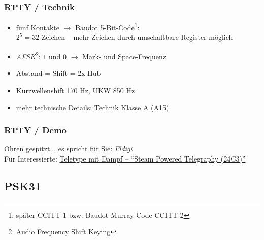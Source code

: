 \begin{frame}
  \frametitle{RTTY / Technik}

  \begin{itemize}
    \item fünf Kontakte $\rightarrow$ Baudot 5-Bit-Code\footnote{später
      CCITT-1 bzw. Baudot-Murray-Code CCITT-2}: \\
      $2^5 = 32$ Zeichen -- mehr
      Zeichen durch umschaltbare Register möglich
    \item \emph{AFSK}\footnote{Audio Frequency Shift Keying}:
      $1$ und $0$ $\rightarrow$ Mark- und Space-Frequenz
    \item Abstand = Shift = 2x Hub
    \item Kurzwellenshift 170 Hz, UKW 850 Hz
    \item mehr technische Details: Technik Klasse A (A15)
  \end{itemize}

\end{frame}

\begin{frame}
  \frametitle{RTTY / Demo}

  \Large{Ohren gespitzt... es spricht für Sie: \emph{Fldigi}}\\[2em]
  \pause
  \bigskip
  \normalsize
  Für Interessierte:
  \href{https://media.ccc.de/v/24c3-2338-en-steam_powered_telegraphy}{\ExternalLink Teletype mit Dampf -- ``Steam Powered Telegraphy (24C3)''}

\end{frame}

\subsection{PSK31}

